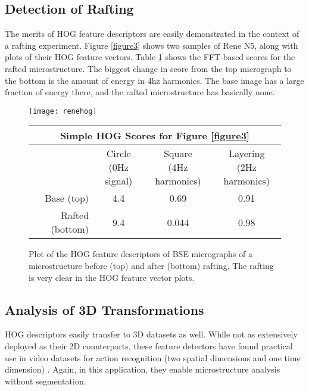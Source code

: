 \documentclass[review]{elsarticle}
\begin{document}
	\subsection{Detection of Rafting}
	The merits of HOG feature descriptors are easily demonstrated in the context of a rafting experiment. Figure \ref{figure3} shows two samples of Rene N5, along with plots of their HOG feature vectors. Table \ref{table2} shows the FFT-based scores for the rafted microstructure. The biggest change in score from the top micrograph to the bottom is the amount of energy in 4hz harmonics. The base image has a large fraction of energy there, and the rafted microstructure has basically none.
	
	\begin{figure}[!ht]
		\begin{center}
			\texttt{[image: renehog]}
	  		\caption{ Plot of the HOG feature descriptors of BSE micrographs of a microstructure before (top) and after (bottom) rafting. The rafting is very clear in the HOG feature vector plots. }
	  		\label{figure3}
  		
			\begin{tabular}{ r | c | c | c }
				\multicolumn{4}{c}{Simple HOG Scores for Figure \ref{figure3}} \\
				\hline
				& \shortstack{Circle \\ (0Hz signal)} & \shortstack{Square \\ (4Hz harmonics)} & \shortstack{Layering \\ (2Hz harmonics)} \\
				\hline
				Base (top) & 4.4 & 0.69 & 0.91 \\
				Rafted (bottom) & 9.4 & 0.044 & 0.98 \\
				\hline
			\end{tabular}
			
	  		\label{table2}
		\end{center}
	\end{figure}
	
	\subsection{Analysis of 3D Transformations}
	HOG descriptors easily transfer to 3D datasets as well. While not as extensively deployed as their 2D counterparts, these feature detectors have found practical use in video datasets for action recognition (two spatial dimensions and one time dimension) \cite{hog3d1}. Again, in this application, they enable microstructure analysis without segmentation.
\end{document}
